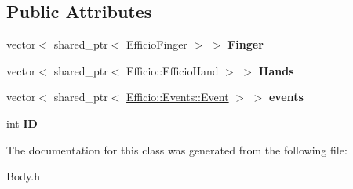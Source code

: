 \subsection*{Public Attributes}
\begin{DoxyCompactItemize}
\item 
vector$<$ shared\+\_\+ptr$<$ Efficio\+Finger $>$ $>$ {\bfseries Finger}\hypertarget{class_efficio_1_1_body_a00c35274feed9e349b563624aa6ff10e}{}\label{class_efficio_1_1_body_a00c35274feed9e349b563624aa6ff10e}

\item 
vector$<$ shared\+\_\+ptr$<$ Efficio\+::\+Efficio\+Hand $>$ $>$ {\bfseries Hands}\hypertarget{class_efficio_1_1_body_a5b9a2bd26f756acc9035acb248e70e20}{}\label{class_efficio_1_1_body_a5b9a2bd26f756acc9035acb248e70e20}

\item 
vector$<$ shared\+\_\+ptr$<$ \hyperlink{class_efficio_1_1_events_1_1_event}{Efficio\+::\+Events\+::\+Event} $>$ $>$ {\bfseries events}\hypertarget{class_efficio_1_1_body_a13f535b3541b6ea9b4bedfafd1512b46}{}\label{class_efficio_1_1_body_a13f535b3541b6ea9b4bedfafd1512b46}

\item 
int {\bfseries ID}\hypertarget{class_efficio_1_1_body_a58fe808d6666d9678a36b2eb0e62822a}{}\label{class_efficio_1_1_body_a58fe808d6666d9678a36b2eb0e62822a}

\end{DoxyCompactItemize}


The documentation for this class was generated from the following file\+:\begin{DoxyCompactItemize}
\item 
Body.\+h\end{DoxyCompactItemize}
